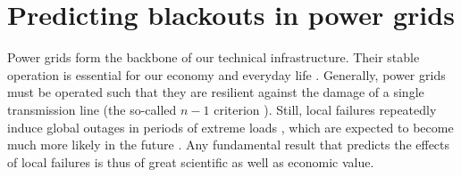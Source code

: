 \documentclass[10pt,aps,pra,twocolumn,superscriptaddress]{revtex4-1}
\begin{document}
\section{Predicting blackouts in power grids}
\label{sec:powergrid}

Power grids form the backbone of our technical infrastructure. Their stable operation is essential for our economy and everyday life \cite{Stro01,Pour06}. Generally, power grids must be operated such that they are resilient against the damage of a single transmission line (the so-called $n-1$ criterion \cite{UCTE04}). Still, local failures repeatedly induce global outages in periods of extreme loads \cite{Pour06}, which are expected to become much more likely in the future \cite{Pesc14}. Any fundamental result that predicts the effects of local failures is thus of great scientific as well as economic value.
\end{document}
